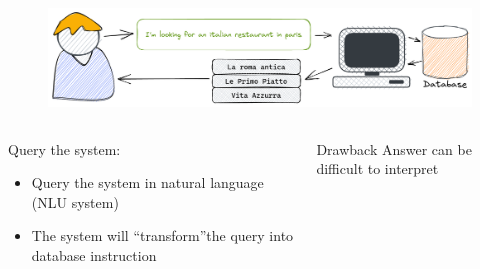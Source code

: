 \documentclass[10pt,aspectratio=169]{beamer}
\begin{document}
\begin{frame}
    \begin{figure}[t]
        \centering
        \includegraphics[width=.9\textwidth]{media/task-dial-3.png}
    \end{figure}
    \begin{columns}
        \begin{column}{0.5\textwidth}
            \begin{block}{Query the system:}
                \begin{itemize}
                    \item Query the system in natural language (NLU system) 
                    \item The system will ``transform''the query into database instruction
                \end{itemize}
            \end{block}
        \end{column}
        \begin{column}{0.5\textwidth}
            \begin{alertblock}{Drawback}
                Answer can be difficult to interpret
            \end{alertblock}
        \end{column}
    \end{columns}
\end{frame}
\end{document}
